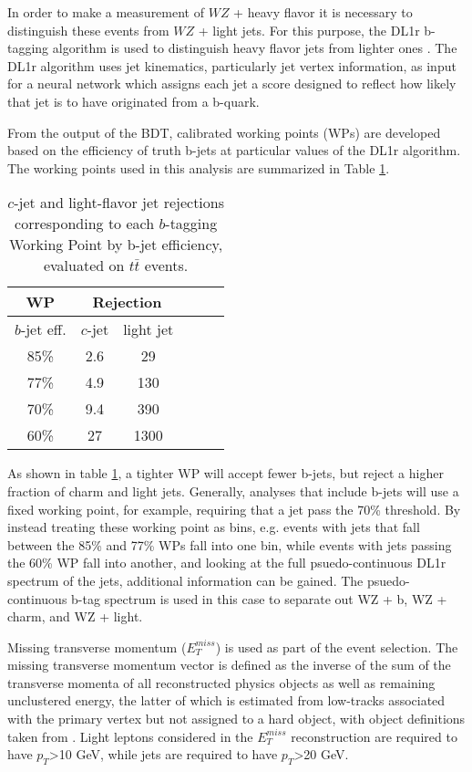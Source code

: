 In order to make a measurement of $WZ$ + heavy flavor it is necessary to distinguish these events from $WZ$ + light jets. For this purpose, the DL1r b-tagging algorithm is used to distinguish heavy flavor jets from lighter ones \cite{btagging}. The DL1r algorithm uses jet kinematics, particularly jet vertex information, as input for a neural network which assigns each jet a score designed to reflect how likely that jet is to have originated from a b-quark. 

From the output of the BDT, calibrated working points (WPs) are developed based on the efficiency of truth b-jets at particular values of the DL1r algorithm. The working points used in this analysis are summarized in Table \ref{tab:btag_WPs}. 

\begin{table}[H] 
\begin{center}
\begin{tabular}{|c|ccccc|}
    \hline
    WP & \multicolumn{2}{c}{Rejection}\\
    \hline
    $b$-jet eff. & $c$-jet & light jet\\
    \hline
    85\% & 2.6 & 29 \\
    77\% & 4.9 & 130 \\
    70\% & 9.4 & 390 \\
    60\% & 27 & 1300 \\ 
    \end{tabular}    
    \caption{$c$-jet and light-flavor jet rejections corresponding to each $b$-tagging Working Point by b-jet efficiency, evaluated on $t\bar{t}$ events.}
    \label{tab:btag_WPs}
    \end{center}
\end{table}

As shown in table \ref{tab:btag_WPs}, a tighter WP will accept fewer b-jets, but reject a higher fraction of charm and light jets. Generally, analyses that include b-jets will use a fixed working point, for example, requiring that a jet pass the 70\% threshold. By instead treating these working point as bins, e.g. events with jets that fall between the 85\% and 77\% WPs fall into one bin, while events with jets passing the 60\% WP fall into another, and looking at the full psuedo-continuous DL1r spectrum of the jets, additional information can be gained. The psuedo-continuous b-tag spectrum is used in this case to separate out WZ + b, WZ + charm, and WZ + light. 

Missing transverse momentum ($E_T^{miss}$) is used as part of the event selection. The missing transverse momentum vector is defined as the inverse of the sum of the transverse momenta of all reconstructed physics objects as well as remaining unclustered energy, the latter of which is estimated from low-\pt tracks associated with the primary vertex but not assigned to a hard object, with object definitions taken from \cite{ATL-PHYS-PUB-2015-027}. Light leptons considered in the $E_T^{miss}$ reconstruction are required to have $p_T$>10 GeV, while jets are required to have $p_T$>20 GeV.

